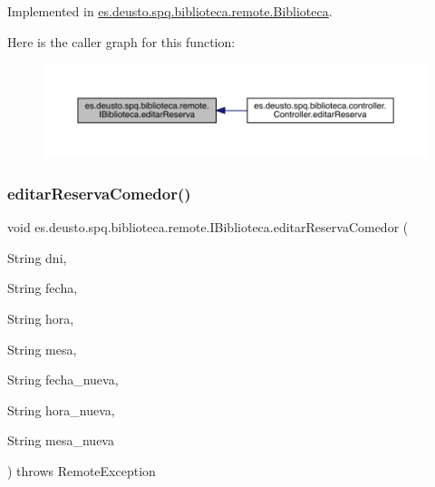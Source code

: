 Implemented in \mbox{\hyperlink{classes_1_1deusto_1_1spq_1_1biblioteca_1_1remote_1_1_biblioteca_a33f2a58e9d6cea4181608d233bfcb158}{es.\+deusto.\+spq.\+biblioteca.\+remote.\+Biblioteca}}.

Here is the caller graph for this function\+:
\nopagebreak
\begin{figure}[H]
\begin{center}
\leavevmode
\includegraphics[width=350pt]{interfacees_1_1deusto_1_1spq_1_1biblioteca_1_1remote_1_1_i_biblioteca_aa7df9834f70a04eaa4ce64e30bce0ede_icgraph}
\end{center}
\end{figure}
\mbox{\label{interfacees_1_1deusto_1_1spq_1_1biblioteca_1_1remote_1_1_i_biblioteca_ac492277af5ed00def28276cd8b0a5394}} 
\subsubsection{\texorpdfstring{editar\+Reserva\+Comedor()}{editarReservaComedor()}}
{\footnotesize\ttfamily void es.\+deusto.\+spq.\+biblioteca.\+remote.\+I\+Biblioteca.\+editar\+Reserva\+Comedor (\begin{DoxyParamCaption}\item[{String}]{dni,  }\item[{String}]{fecha,  }\item[{String}]{hora,  }\item[{String}]{mesa,  }\item[{String}]{fecha\+\_\+nueva,  }\item[{String}]{hora\+\_\+nueva,  }\item[{String}]{mesa\+\_\+nueva }\end{DoxyParamCaption}) throws Remote\+Exception}




